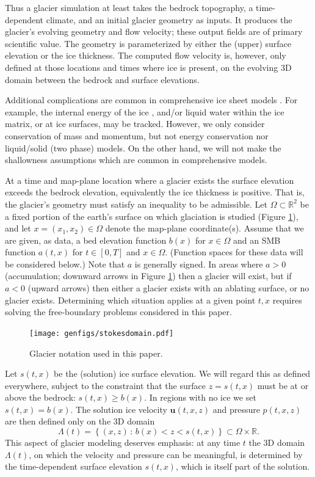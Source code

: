 \documentclass[hidelinks,onefignum,onetabnum,final]{siamart220329}  %
\newcommand{\RR}{\mathbb{R}}
\newcommand{\bu}{\mathbf{u}}
\begin{document}
Thus a glacier simulation at least takes the bedrock topography, a time-dependent climate, and an initial glacier geometry as inputs.  It produces the glacier's evolving geometry and flow velocity; these output fields are of primary scientific value.  The geometry is parameterized by either the (upper) surface elevation or the ice thickness.  The computed flow velocity is, however, only defined at those locations and times where ice is present, on the evolving 3D domain between the bedrock and surface elevations.

Additional complications are common in comprehensive ice sheet models \cite{SchoofHewitt2013}.  For example, the internal energy of the ice \cite{Aschwandenetal2012}, and/or liquid water within the ice matrix, or at ice surfaces, may be tracked.  However, we only consider conservation of mass and momentum, but not energy conservation nor liquid/solid (two phase) models.  On the other hand, we will not make the shallowness assumptions which are common in comprehensive models.

At a time and map-plane location where a glacier exists the surface elevation exceeds the bedrock elevation, equivalently the ice thickness is positive.  That is, the glacier's geometry must satisfy an inequality to be admissible.  Let $\Omega \subset \RR^2$ be a fixed portion of the earth's surface on which glaciation is studied (Figure \ref{fig:stokesdomain}), and let $x=(x_1,x_2)\in\Omega$ denote the map-plane coordinate(s).  Assume that we are given, as data, a bed elevation function $b(x)$ for $x\in\Omega$ and an SMB function $a(t,x)$ for $t\in [0,T]$ and $x\in \Omega$.  (Function spaces for these data will be considered below.)  Note that $a$ is generally signed.  In areas where $a>0$ (accumulation; downward arrows in Figure \ref{fig:stokesdomain}) then a glacier will exist, but if $a<0$ (upward arrows) then either a glacier exists with an ablating surface, or no glacier exists.  Determining which situation applies at a given point $t,x$ requires solving the free-boundary problems considered in this paper.

\medskip
\begin{figure}[ht]
\centering
\texttt{[image: genfigs/stokesdomain.pdf]}
\caption{Glacier notation used in this paper.}
\label{fig:stokesdomain}
\end{figure}

\medskip
Let $s(t,x)$ be the (solution) ice surface elevation.  We will regard this as defined everywhere, subject to the constraint that the surface $z=s(t,x)$ must be at or above the bedrock: $s(t,x) \ge b(x)$.  In regions with no ice we set $s(t,x)=b(x)$.  The solution ice velocity $\bu(t,x,z)$ and pressure $p(t,x,z)$ are then defined only on the 3D domain
\begin{equation}
\Lambda(t) = \left\{(x,z)\,:\,b(x) < z < s(t,x)\right\} \subset \Omega \times \RR. \label{eq:icydomain}
\end{equation}
This aspect of glacier modeling deserves emphasis: at any time $t$ the 3D domain $\Lambda(t)$, on which the velocity and pressure can be meaningful, is determined by the time-dependent surface elevation $s(t,x)$, which is itself part of the solution.
\end{document}
